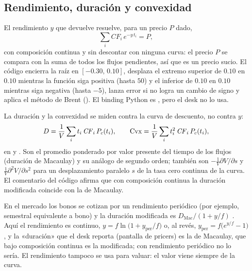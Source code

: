 \subsection{Rendimiento, duración y convexidad}\label{sec:cap06-rendimiento}

El rendimiento $y$ que devuelve  resuelve, para un precio $P$
dado,
\begin{equation}\label{eq:cap06-rendimiento}
  \sum_{i}\mathit{CF}_i\,e^{-y\,t_i}=P,
\end{equation}
con composición continua y sin descontar con ninguna curva: el precio $P$ se compara con la suma de todos los
flujos pendientes, así que es un precio sucio. El código encierra la raíz en $[-0.30,\,0.10]$, desplaza el extremo
superior de $0.10$ en $0.10$ mientras la función siga positiva (hasta $50$) y el inferior de $0.10$ en $0.10$
mientras siga negativa (hasta $-5$), lanza error si no logra un cambio de signo y aplica el método de Brent
(). El binding Python es
, pero el desk no lo usa.

La duración y la convexidad se miden contra la curva de descuento, no contra $y$:
\begin{equation}\label{eq:cap06-duracion}
  D=\frac{1}{V}\sum_{i}t_i\,\mathit{CF}_i\,P_{c}(t_i),\qquad
  \mathrm{Cvx}=\frac{1}{V}\sum_{i}t_i^{2}\,\mathit{CF}_i\,P_{c}(t_i),
\end{equation}
en  y .
Son el promedio ponderado por valor presente del tiempo de los flujos (duración de Macaulay) y su
análogo de segundo orden; también son $-\frac1V\partial V/\partial s$ y $\frac1V\partial^2V/\partial s^2$
para un desplazamiento paralelo $s$ de la tasa cero continua de la curva. El comentario del código afirma que
con composición continua la duración modificada coincide con la de Macaulay.

\begin{diferencia}
  En el mercado los bonos se cotizan por un rendimiento periódico (por ejemplo, semestral equivalente a
  bono) y la duración modificada es $D_{\mathrm{Mac}}/(1+y/f)$ \citep{hull2018,tuckman2012}. Aquí el
  rendimiento es continuo, $y=f\ln\!\bigl(1+y_{\mathrm{per}}/f\bigr)$ o, al revés,
  $y_{\mathrm{per}}=f\bigl(e^{y/f}-1\bigr)$, y la «duración» que el desk reporta (pantalla de pricers) es la de
  Macaulay, que bajo composición continua es la modificada; con rendimiento periódico no lo sería. El
  rendimiento tampoco se usa para valuar: el valor viene siempre de la curva.
\end{diferencia}

